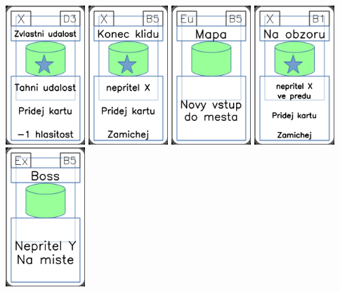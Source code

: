 \documentclass[a4paper]{article}
\begin{document}
	\includegraphics[width=3.0cm]{img-5_17}
	\includegraphics[width=3.0cm]{img-5_9}
	\includegraphics[width=3.0cm]{img-4_39}
	\includegraphics[width=3.0cm]{img-5_5}
	\includegraphics[width=3.0cm]{img-4_9}
\end{document}
